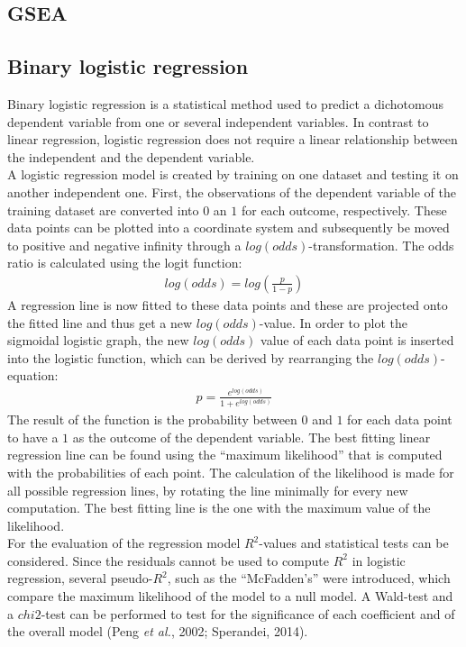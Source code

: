 \documentclass[
  parskip,
  oneside]{scrreprt}
\begin{document}
\hypertarget{gsea}{%
\subsection{GSEA}\label{gsea}}

\hypertarget{binary-logistic-regression}{%
\subsection{Binary logistic
regression}\label{binary-logistic-regression}}

Binary logistic regression is a statistical method used to predict a
dichotomous dependent variable from one or several independent
variables. In contrast to linear regression, logistic regression does
not require a linear relationship between the independent and the
dependent variable.\\
A logistic regression model is created by training on one dataset and
testing it on another independent one. First, the observations of the
dependent variable of the training dataset are converted into \(0\) an
\(1\) for each outcome, respectively. These data points can be plotted
into a coordinate system and subsequently be moved to positive and
negative infinity through a \(log(odds)\)-transformation. The odds ratio
is calculated using the logit function: \begin{gather*}
log(odds)=log(\frac{p}{1-p})
\end{gather*} A regression line is now fitted to these data points and
these are projected onto the fitted line and thus get a new
\(log(odds)\)-value. In order to plot the sigmoidal logistic graph, the
new \(log(odds)\) value of each data point is inserted into the logistic
function, which can be derived by rearranging the
\(log(odds)\)-equation: \begin{gather*}
p=\frac{e^{log(odds)}}{1+e^{log(odds)}}
\end{gather*} The result of the function is the probability between
\(0\) and \(1\) for each data point to have a \(1\) as the outcome of
the dependent variable. The best fitting linear regression line can be
found using the ``maximum likelihood'' that is computed with the
probabilities of each point. The calculation of the likelihood is made
for all possible regression lines, by rotating the line minimally for
every new computation. The best fitting line is the one with the maximum
value of the likelihood.\\
For the evaluation of the regression model \(R^2\)-values and
statistical tests can be considered. Since the residuals cannot be used
to compute \(R^2\) in logistic regression, several pseudo-\(R^2\), such
as the ``McFadden's'' were introduced, which compare the maximum
likelihood of the model to a null model. A Wald-test and a \(chi2\)-test
can be performed to test for the significance of each coefficient and of
the overall model (Peng \emph{et al.}, 2002; Sperandei, 2014).
\end{document}

